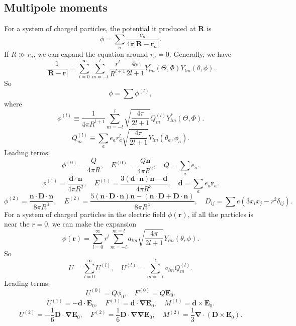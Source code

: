 \subsection{Multipole moments}
For a system of charged particles, the potential it produced at $\bm{R}$ is
\[\phi = \sum_a \frac{e_a}{4\pi|\bm{R} - \bm{r}_a|}.\]
If $R \gg r_a$, we can expand the equation around $r_a=0$. Generally, we have
\[\frac{1}{|\bm{R} - \bm{r}|} = \sum_{l=0}^{\infty} \sum_{m=-l}^{l} \frac{r^l}{R^{l+1}} \frac{4\pi}{2l+1} Y^*_{lm}(\Theta,\Phi)Y_{lm}(\theta,\phi).\]
So
\[\phi = \sum \phi^{(l)},\]
where
\[\phi^{(l)} \equiv \frac{1}{4\pi R^{l+1}} \sum_{m=-l}^{l} \sqrt{\frac{4\pi}{2l+1}} Q_{m}^{(l)} Y^*_{lm}(\Theta,\Phi).\]
\[Q_m^{(l)} \equiv \sum_a e_a r_a^l \sqrt{\frac{4\pi}{2l+1}} Y_{lm}(\theta_a,\phi_a).\]
Leading terms: 
\[\phi^{(0)} = \frac{Q}{4\pi R} , \quad E^{(0)} = \frac{Q\bm{n}}{4\pi R^2} , \quad Q = \sum_a e_a.\]
\[\phi^{(1)} = \frac{\bm{d} \cdot \bm{n}}{4\pi R^2}  , \quad E^{(1)} = \frac{3(\bm{d}\cdot\bm{n})\bm{n}-\bm{d}}{4\pi R^3} , \quad \bm{d} = \sum_a e_a \bm{r}_a.\]
\[\phi^{(2)} = \frac{\bm{n} \cdot \bm{D} \cdot \bm{n}}{8\pi R^3} , \quad E^{(2)} = \frac{5(\bm{n} \cdot \bm{D} \cdot \bm{n})\bm{n} - (\bm{n} \cdot \bm{D} + \bm{D} \cdot \bm{n})}{8\pi R^4} , \quad D_{ij} = \sum e(3x_ix_j-r^2\delta_{ij}).\]
For a system of charged particles in the electric field $\phi(\bm{r})$, if all the particles is near the $r=0$, we can make the expansion
\[\phi(\bm{r}) = \sum_{l=0}^{\infty} r^l \sum_{m=-l}^{m=l} a_{lm} \sqrt{\frac{4\pi}{2l+1}} Y_{lm}(\theta,\phi).\]
So
\[U = \sum_{l=0}^{\infty} U^{(l)} , \quad U^{(l)} = \sum_{m=-l}^{l} a_{lm}Q^{(l)}_m.\]
Leading terms: 
\[U^{(0)} = Q\phi_0 , \quad F^{(0)} = Q\bm{E}_0.\]
\[U^{(1)} = -\bm{d}\cdot \bm{E}_0 , \quad F^{(1)} = \bm{d}\cdot \bm{\nabla}\bm{E}_0 , \quad M^{(1)} = \bm{d} \times \bm{E}_0.\]
\[U^{(2)} = -\frac{1}{6}\bm{D}\cdot \bm{\nabla}\bm{E}_0 , \quad F^{(2)} = \frac{1}{6} \bm{D}\cdot \bm{\nabla}\bm{\nabla}\bm{E}_0 , \quad M^{(2)} = \frac{1}{3} \bm{\nabla} \cdot (\bm{D} \times \bm{E}_0).\]

